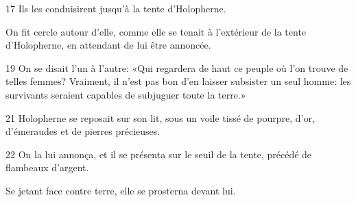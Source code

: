 

17 Ils les conduisirent jusqu'à la tente d'Holopherne.

On fit cercle autour d'elle, comme elle se tenait à l'extérieur de la tente d'Holopherne, en attendant de lui être annoncée.

19 On se disait l'un à l'autre: «Qui regardera de haut ce peuple où l'on trouve de telles femmes? Vraiment, il n'est pas bon d'en laisser subsister un seul homme: les survivants seraient capables de subjuguer toute la terre.»

21 Holopherne se reposait sur son lit, sous un voile tissé de pourpre, d'or, d'émeraudes et de pierres précieuses.

22 On la lui annonça, et il se présenta sur le seuil de la tente, précédé de flambeaux d'argent.

Se jetant face contre terre, elle se prosterna devant lui.